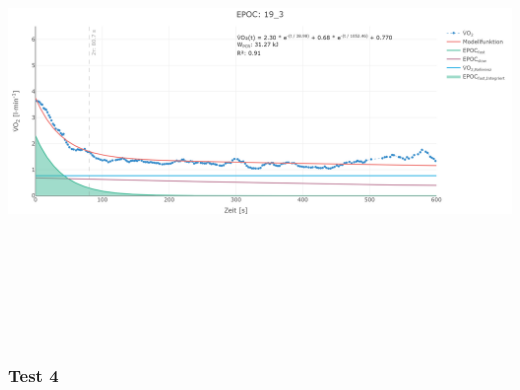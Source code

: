 \documentclass[
  letterpaper,
  DIV=11]{scrartcl}
\begin{document}
\includegraphics[width=11.45833in,height=4.6875in]{images/19_3.png}

\subsubsection{Test 4}
\end{document}
